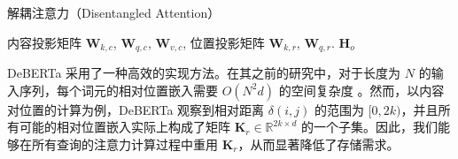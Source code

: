 \begin{algorithm}[htb]
\caption{解耦注意力（Disentangled Attention）}
\label{algo:DA}
 \begin{algorithmic}[1]
    内容投影矩阵 $\mathbf{W}_{k,c}$, $\mathbf{W}_{q,c}$, $\mathbf{W}_{v,c}$,
    位置投影矩阵 $\mathbf{W}_{k,r}$, $\mathbf{W}_{q,r}$.
    \Ensure $\mathbf{H}_o$

    \EndFor
        \EndFor
    \EndFor
    \EndFor
        \EndFor
    \EndFor
 \end{algorithmic}

\end{algorithm}

DeBERTa 采用了一种高效的实现方法。在其之前的研究中，对于长度为 \(N\) 的输入序列，每个词元的相对位置嵌入需要 \(O(N^{2}d)\) 的空间复杂度 \cite{Shaw2018SelfAttentionWR, Huang2018MusicTG, Dai2019TransformerXLAL}。然而，以内容对位置的计算为例，DeBERTa 观察到相对距离 \(\delta(i, j)\) 的范围为 \([0, 2k)\)，并且所有可能的相对位置嵌入实际上构成了矩阵 \(\mathbf{K}_{r} \in \mathbb{R}^{2k \times d}\) 的一个子集。因此，我们能够在所有查询的注意力计算过程中重用 \(\mathbf{K}_{r}\)，从而显著降低了存储需求。

